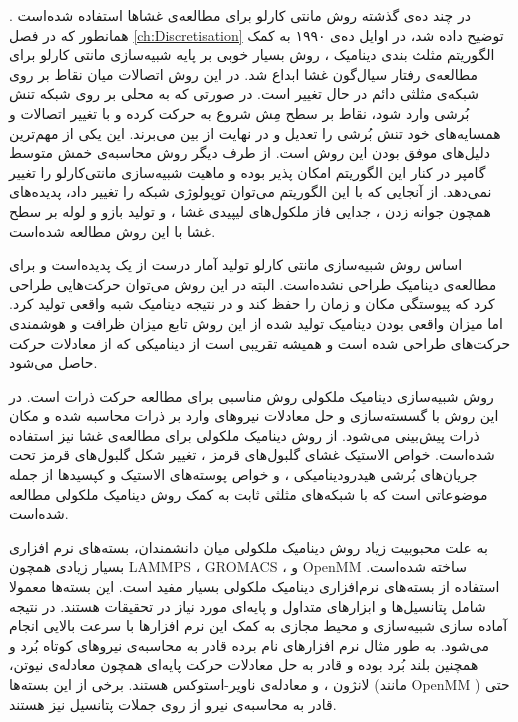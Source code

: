 در چند ده‌ی گذشته روش‌ مانتی‌ کارلو برای مطالعه‌ی غشا‌ها استفاده شده‌است
\cite{Canham1970, Evans1974, schneider1984, Nelson1987PRA, NelsonPRL1987, Gompper1991, Gompper1992Science, Lim2002PNAS, Gompper2005PRE}
. همانطور که در فصل 
\ref{ch:Discretisation}
توضیح داده شد، در اوایل ده‌ی ۱۹۹۰ به کمک الگوریتم مثلث بندی دینامیک
\cite{Boal1992PRA, Gompper1992Science}
، روش‌ بسیار خوبی بر پایه شبیه‌سازی مانتی کارلو برای مطالعه‌ی رفتار سیال‌گون غشا ابداع شد. در این روش اتصالات میان نقاط بر روی شبکه‌ی مثلثی دائم در حال تغییر است. در صورتی که به محلی بر روی شبکه تنش بُرشی وارد شود، نقاط بر سطح مِش شروع به حرکت کرده و با تغییر اتصالات و همسایه‌های خود تنش بُرشی را تعدیل و در نهایت از بین می‌برند. این یکی از مهم‌ترین دلیل‌های موفق بودن این روش است. از طرف دیگر روش محاسبه‌ی خمش متوسط گامپر
\cite{Gompper1992Science}
در کنار این الگوریتم امکان پذیر بوده و ماهیت شبیه‌سازی مانتی‌کارلو را تغییر نمی‌دهد. از آنجایی که با این الگوریتم می‌توان توپولوژی شبکه را تغییر داد، پدیده‌های همچون جوانه زدن
، جدایی فاز ملکول‌های لیپیدی غشا
\cite{Kohyama2003PRE, Gompper2007PRL, Laradji2004PRL}
، و تولید بازو‌ و لوله‌ 
بر سطح غشا
\cite{Ramakrishnan2013BiophysJ}
با این روش مطالعه شده‌است. 

اساس روش شبیه‌سازی مانتی کارلو تولید آمار درست از یک پدیده‌است و برای مطالعه‌ی دینامیک طراحی نشده‌است. البته در این روش می‌توان حرکت‌هایی طراحی کرد که پیوستگی مکان و زمان را حفظ کند و در نتیجه دینامیک شبه  واقعی تولید کرد. اما میزان واقعی بودن دینامیک تولید شده از این روش تابع میزان ظرافت و هوشمندی  حرکت‌های طراحی شده است و همیشه تقریبی است از دینامیکی که از معادلات حرکت حاصل می‌شود.

روش شبیه‌سازی دینامیک ملکولی روش مناسبی برای مطالعه حرکت ذرات است. در این روش با گسسته‌سازی و حل معادلات نیرو‌های وارد بر ذرات محاسبه شده و  مکان ذرات پیش‌بینی  می‌شود. از روش دینامیک ملکولی برای مطالعه‌ی غشا نیز استفاده شده‌است. خواص الاستیک غشای گلبول‌های قرمز
\cite{Hale2009SoftMatter, Geekiyanage2019PLOS}
، تغییر شکل گلبول‌های قرمز تحت جریان‌های بُرشی هیدرودینامیکی 
\cite{Noguchi2005PNAS}
، و  خواص پوسته‌های الاستیک و کپسید‌ها
\cite{NelsonPRL1987, gomppernelson2012}
از جمله موضوعاتی است که با شبکه‌های مثلثی ثابت به کمک روش دینامیک ملکولی مطالعه شده‌است.

به علت محبوبیت زیاد روش دینامیک ملکولی میان دانشمندان، بسته‌های نرم‌ افزار‌ی بسیار زیادی همچون 
LAMMPS \cite{LAMMPS}
،
GROMACS \cite{GROMACS}
، و
OpenMM \cite{OpenMM2017}
ساخته‌ شده‌است. استفاده از بسته‌های نرم‌افزاری دینامیک ملکولی بسیار مفید است. این بسته‌ها معمولا شامل پتانسیل‌ها و ابزار‌های متداول و پایه‌ای مورد نیاز در تحقیقات هستند. در نتیجه آماده سازی شبیه‌سازی و محیط مجازی به کمک این نرم افزار‌ها با سرعت بالایی انجام می‌شود. به طور مثال نرم افزار‌های نام برده قادر به محاسبه‌ی نیروهای کوتاه بُرد و همچنین بلند بُرد بوده و قادر به حل معادلات حرکت پایه‌ای همچون معادله‌ی نیوتن، لانژون
، و معادله‌ی ناویر-استوکس
هستند. برخی از این بسته‌ها (مانند 
OpenMM
) حتی قادر به محاسبه‌ی نیرو از روی جملات پتانسیل نیز هستند. 


